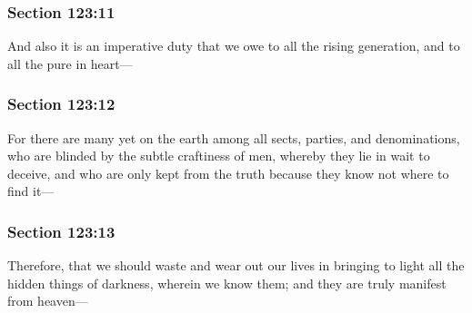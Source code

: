 	\subsubsection{Section 123:11} %
		\label{DC123-11}

		And also it is an imperative duty that we owe to all the rising generation, and to all the pure in heart—


	\subsubsection{Section 123:12} %
		\label{DC123-12}

		For there are many yet on the earth among all sects, parties, and denominations, who are blinded by the subtle craftiness of men, whereby they lie in wait to deceive, and who are only kept from the truth because they know not where to find it—


	\subsubsection{Section 123:13} %
		\label{DC123-13}

		Therefore, that we should waste and wear out our lives in bringing to light all the hidden things of darkness, wherein we know them; and they are truly manifest from heaven—


